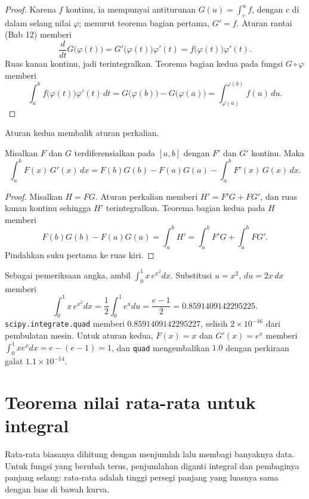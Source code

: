 \begin{proof}
Karena $f$ kontinu, ia mempunyai antiturunan $G(u)=\int_c^u f$, dengan $c$ di dalam
selang nilai $\varphi$; menurut teorema bagian pertama, $G'=f$. Aturan rantai (Bab 12)
memberi
\[
\frac{d}{dt}G\bigl(\varphi(t)\bigr)=G'\bigl(\varphi(t)\bigr)\varphi'(t)
=f\bigl(\varphi(t)\bigr)\varphi'(t).
\]
Ruas kanan kontinu, jadi terintegralkan. Teorema bagian kedua pada fungsi
$G\circ\varphi$ memberi
\[
\int_a^b f\bigl(\varphi(t)\bigr)\varphi'(t)\,dt
=G\bigl(\varphi(b)\bigr)-G\bigl(\varphi(a)\bigr)
=\int_{\varphi(a)}^{\varphi(b)}f(u)\,du .
\]
\end{proof}

Aturan kedua membalik aturan perkalian.

\begin{proposisi}
Misalkan $F$ dan $G$ terdiferensialkan pada $[a,b]$ dengan $F'$ dan $G'$ kontinu. Maka
\[
\int_a^b F(x)\,G'(x)\,dx=F(b)G(b)-F(a)G(a)-\int_a^b F'(x)\,G(x)\,dx .
\]
\end{proposisi}

\begin{proof}
Misalkan $H=FG$. Aturan perkalian memberi $H'=F'G+FG'$, dan ruas kanan kontinu
sehingga $H'$ terintegralkan. Teorema bagian kedua pada $H$ memberi
\[
F(b)G(b)-F(a)G(a)=\int_a^b H'=\int_a^b F'G+\int_a^b FG' .
\]
Pindahkan suku pertama ke ruas kiri.
\end{proof}


Sebagai pemeriksaan angka, ambil $\int_0^1 x\,e^{x^2}dx$. Substitusi $u=x^2$,
$du=2x\,dx$ memberi
\[
\int_0^1 x\,e^{x^2}dx=\frac12\int_0^1 e^{u}du=\frac{e-1}{2}=0.8591409142295225 .
\]
\texttt{scipy.integrate.quad} memberi $0.8591409142295227$, selisih $2\times10^{-16}$
dari pembulatan mesin. Untuk aturan kedua, $F(x)=x$ dan $G'(x)=e^x$ memberi
$\int_0^1 xe^xdx=e-(e-1)=1$, dan \texttt{quad} mengembalikan $1.0$ dengan perkiraan
galat $1.1\times10^{-14}$.

\section{Teorema nilai rata-rata untuk integral}

Rata-rata biasanya dihitung dengan menjumlah lalu membagi banyaknya data. Untuk fungsi
yang berubah terus, penjumlahan diganti integral dan pembaginya panjang selang: rata-rata
adalah tinggi persegi panjang yang luasnya sama dengan luas di bawah kurva.

